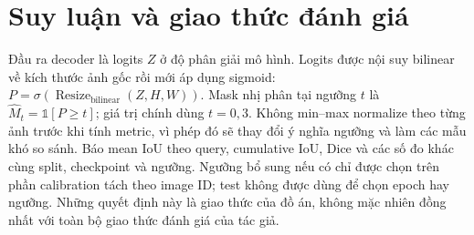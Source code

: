 \section{Suy luận và giao thức đánh giá}
Đầu ra decoder là logits $Z$ ở độ phân giải mô hình. Logits được nội suy bilinear về kích thước ảnh gốc rồi mới áp dụng sigmoid: $P=\sigma(\operatorname{Resize}_{\mathrm{bilinear}}(Z,H,W))$. Mask nhị phân tại ngưỡng $t$ là $\widehat{M}_t=\mathbb{1}[P\ge t]$; giá trị chính dùng $t=0{,}3$. Không min--max normalize theo từng ảnh trước khi tính metric, vì phép đó sẽ thay đổi ý nghĩa ngưỡng và làm các mẫu khó so sánh. Báo mean IoU theo query, cumulative IoU, Dice và các số đo khác cùng split, checkpoint và ngưỡng. Ngưỡng bổ sung nếu có chỉ được chọn trên phần calibration tách theo image ID; test không được dùng để chọn epoch hay ngưỡng. Những quyết định này là giao thức của đồ án, không mặc nhiên đồng nhất với toàn bộ giao thức đánh giá của tác giả.
